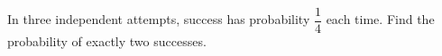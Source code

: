 In three independent attempts, success has probability $\dfrac{1}{4}$ each time. Find the probability of exactly two successes.
